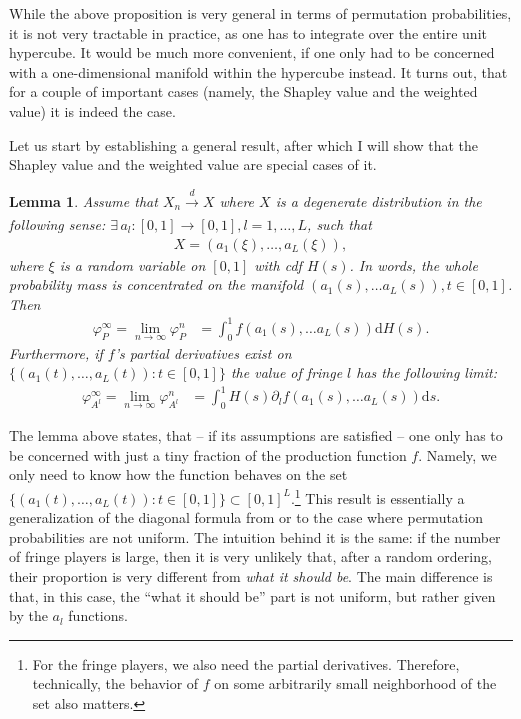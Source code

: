\documentclass[a4paper]{article}
\newtheorem{lemma}{Lemma}
\newcommand{\ds}{\mathrm{d}s}
\begin{document}
While the above proposition is very general in terms of permutation probabilities, it is not very tractable in practice, as one has to integrate over the entire unit hypercube.
It would be much more convenient, if one only had to be concerned with a one-dimensional manifold within the hypercube instead.
It turns out, that for a couple of important cases (namely, the Shapley value and the weighted value) it is indeed the case.

Let us start by establishing a general result, after which I will show that the Shapley value and the weighted value are special cases of it.

\begin{lemma}
    \label{lem:many_sided_manifold}
    Assume that $X_n \xrightarrow[]{d} X$ where $X$ is a degenerate distribution in the following sense: $\exists \, a_l: [0, 1] \to [0, 1], l = 1, \dots, L$, such that
    \begin{align*}
        X = (a_1(\xi), \dots, a_L(\xi)),
    \end{align*}
    where $\xi$ is a random variable on $[0, 1]$ with cdf $H(s)$.
    In words, the whole probability mass is concentrated on the manifold $(a_1(s), \dots a_L(s)), t \in [0, 1]$.
    Then
    \begin{align*}
        \varphi_P^\infty = \lim_{n \to \infty} \varphi_P^n &= \int_0^1 f(a_1(s), \dots a_L(s)) \mathrm{d}H(s).
    \end{align*}
    Furthermore, if $f$'s partial derivatives exist on $\{(a_1(t), \dots, a_L(t)) : t \in [0, 1]\}$ the value of fringe $l$ has the following limit:
    \begin{align*}
        \varphi_{A^l}^\infty = \lim_{n \to \infty} \varphi_{A^l}^n &= \int_0^1 H(s) \partial_l f(a_1(s), \dots a_L(s)) \ds.        
    \end{align*}
\end{lemma}

The lemma above states, that -- if its assumptions are satisfied -- one only has to be concerned with just a tiny fraction of the production function $f$.
Namely, we only need to know how the function behaves on the set $\{(a_1(t), \dots, a_L(t)) : t \in [0, 1]\} \subset [0, 1]^L$.\footnote{
    For the fringe players, we also need the partial derivatives.
    Therefore, technically, the behavior of $f$ on some arbitrarily small neighborhood of the set also matters.
}
This result is essentially a generalization of the diagonal formula from \textcite{aumann2015values} or \textcite{stole1996intra} to the case where permutation probabilities are not uniform.
The intuition behind it is the same: if the number of fringe players is large, then it is very unlikely that, after a random ordering, their proportion is very different from \emph{what it should be}.
The main difference is that, in this case, the ``what it should be'' part is not uniform, but rather given by the $a_l$ functions.
\end{document}

